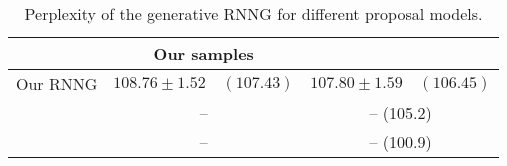 
\begin{table}[h]
\center
  \begin{tabular}{l|c|c}
        & Our samples & \citet{dyer2016rnng}  \\ \hline
      Our RNNG & $108.76 \pm	1.52 \quad (107.43)$ & $107.80 \pm 1.59 \quad (106.45)$ \\
      \citet{dyer2016rnng}  & -- & -- \quad (105.2) \\
      \citet{kuncoro2017syntax} & -- & -- \quad (100.9)
  \end{tabular}
  \caption{Perplexity of the generative RNNG for different proposal models.}
  \label{tab:gen-perplexities}
\end{table}
